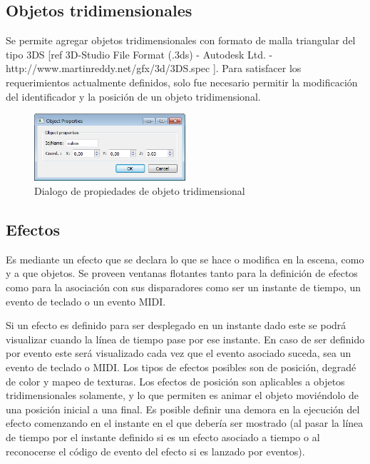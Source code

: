 \subsection{Objetos tridimensionales}

Se permite agregar objetos tridimensionales con formato de malla triangular del tipo 3DS [ref 3D-Studio File Format (.3ds) - Autodesk Ltd. - http://www.martinreddy.net/gfx/3d/3DS.spec ]. Para satisfacer los requerimientos actualmente definidos, solo fue necesario permitir la modificación del identificador y la posición de un objeto tridimensional.

\begin{figure}[H]
  \centering
    \includegraphics[width=0.5\textwidth]{./Cap5_vmt/vmt_objectProperties.png}
  \caption{Dialogo de propiedades de objeto tridimensional}
  \label{fig:VMT-ObjectProperties}
\end{figure}

\subsection{Efectos}

Es mediante un efecto que se declara lo que se hace o modifica en la escena, como y a que objetos. Se proveen ventanas flotantes tanto para la definición de efectos como para la asociación con sus disparadores como ser un instante de tiempo, un evento de teclado o un evento MIDI.

Si un efecto es definido para ser desplegado en un instante dado este se podrá visualizar cuando la línea de tiempo pase por ese instante. En caso de ser definido por evento este será visualizado cada vez que el evento asociado suceda, sea un evento de teclado o MIDI.
Los tipos de efectos posibles son de posición, degradé de color y mapeo de texturas.
Los efectos de posición son aplicables a objetos tridimensionales solamente, y lo que permiten es animar el objeto moviéndolo de una posición inicial a una final. Es posible definir una demora en la ejecución del efecto comenzando en el instante en el que debería ser mostrado (al pasar la línea de tiempo por el instante definido si es un efecto asociado a tiempo o al reconocerse el código de evento del efecto si es lanzado por eventos).

